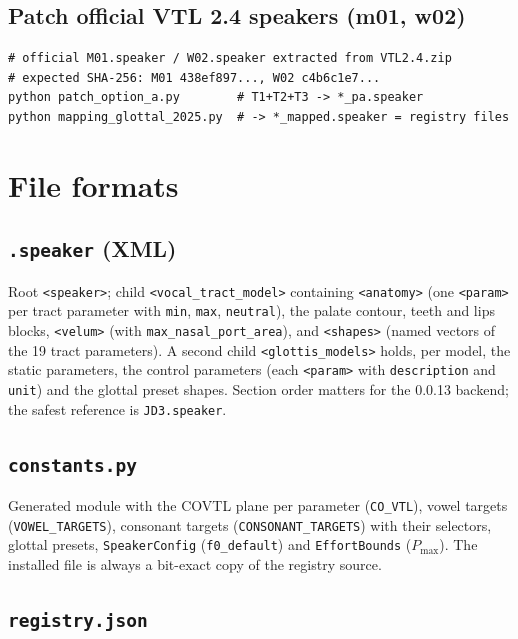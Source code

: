 \documentclass[11pt,a4paper]{article}
\newcommand{\speakerfile}[1]{\texttt{#1.speaker}}
\newcommand{\code}[1]{\texttt{#1}}
\begin{document}
\subsection{Patch official VTL 2.4 speakers (m01, w02)}

\begin{lstlisting}[style=shell]
# official M01.speaker / W02.speaker extracted from VTL2.4.zip
# expected SHA-256: M01 438ef897..., W02 c4b6c1e7...
python patch_option_a.py        # T1+T2+T3 -> *_pa.speaker
python mapping_glottal_2025.py  # -> *_mapped.speaker = registry files
\end{lstlisting}

\section{File formats}\label{sec:formats}

\subsection{\speakerfile{} (XML)}

Root \code{<speaker>}; child \code{<vocal\_tract\_model>} containing
\code{<anatomy>} (one \code{<param>} per tract parameter with
\code{min}, \code{max}, \code{neutral}), the palate contour, teeth and
lips blocks, \code{<velum>} (with \code{max\_nasal\_port\_area}), and
\code{<shapes>} (named vectors of the 19 tract parameters). A second
child \code{<glottis\_models>} holds, per model, the static
parameters, the control parameters (each \code{<param>} with
\code{description} and \code{unit}) and the glottal preset shapes.
Section order matters for the 0.0.13 backend; the safest reference is
\speakerfile{JD3}.

\subsection{\code{constants.py}}

Generated module with the COVTL plane per parameter
(\code{CO\_VTL}), vowel targets (\code{VOWEL\_TARGETS}), consonant
targets (\code{CONSONANT\_TARGETS}) with their selectors, glottal
presets, \code{SpeakerConfig} (\texttt{f0\_default}) and
\code{EffortBounds} ($P_{\max}$). The installed file is always a
bit-exact copy of the registry source.

\subsection{\code{registry.json}}
\end{document}
